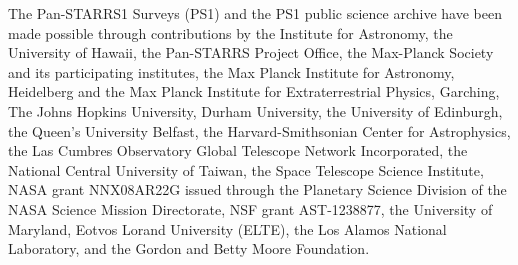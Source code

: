 \documentclass[fleqn,usenatbib]{mnras}
\begin{document}
The Pan-STARRS1 Surveys (PS1) and the PS1 public science archive have been made possible through contributions by the Institute for Astronomy, the University of Hawaii, the Pan-STARRS Project Office, the Max-Planck Society and its participating institutes, the Max Planck Institute for Astronomy, Heidelberg and the Max Planck Institute for Extraterrestrial Physics, Garching, The Johns Hopkins University, Durham University, the University of Edinburgh, the Queen's University Belfast, the Harvard-Smithsonian Center for Astrophysics, the Las Cumbres Observatory Global Telescope Network Incorporated, the National Central University of Taiwan, the Space Telescope Science Institute, NASA grant NNX08AR22G issued through the Planetary Science Division of the NASA Science Mission Directorate, NSF grant AST-1238877, the University of Maryland, Eotvos Lorand University (ELTE), the Los Alamos National Laboratory, and the Gordon and Betty Moore Foundation.




%








\end{document}
